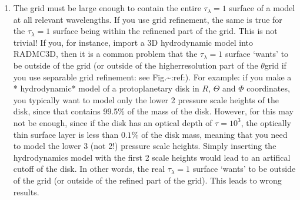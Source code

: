 \documentclass[letterpaper,10pt,english]{sphinxmanual}
\begin{document}
\begin{enumerate}
\item {} 

The grid must be large enough to contain the entire \(\tau_\lambda=1\)
surface of a model at all relevant wavelengths. If you use grid refinement,
the same is true for the \(\tau_\lambda=1\) surface being within the
refinened part of the grid. This is not trivial!  If you, for instance,
import a 3\sphinxhyphen{}D hydrodynamic model into RADMC\sphinxhyphen{}3D, then it is a common problem
that the \(\tau_\lambda=1\) surface ‘wants’ to be outside of the grid (or
outside of the higher\sphinxhyphen{}resolution part of the \(\theta\)\sphinxhyphen{}grid if you use
separable grid refinement: see Fig.\textasciitilde{}:ref:). For example:
if you make a * hydrodynamic* model of a protoplanetary disk in \(R\),
\(\Theta\) and \(\Phi\) coordinates, you typically want to model only
the lower 2 pressure scale heights of the disk, since that contains 99.5\% of
the mass of the disk. However, for  this may not be
enough, since if the disk has an optical depth of \(\tau=10^3\), the
optically thin surface layer is less than \(0.1\%\) of the disk mass,
meaning that you need to model the lower 3 (not 2!) pressure scale
heights. Simply inserting the hydrodynamics model with the first 2 scale
heights would lead to an artifical cut\sphinxhyphen{}off of the disk. In other words, the
real \(\tau_\lambda=1\) surface ‘wants’ to be outside of the grid (or
outside of the refined part of the grid). This leads to wrong results.

\end{enumerate}
\end{document}
